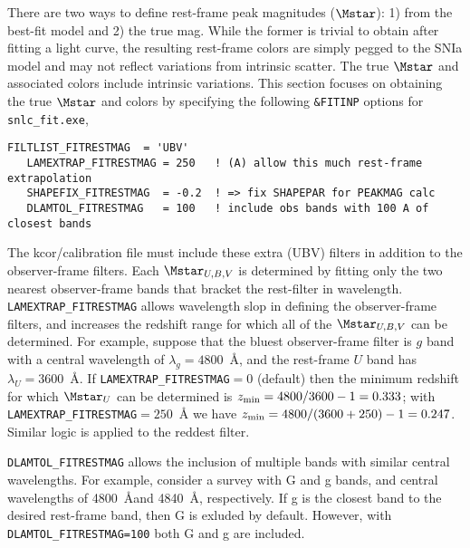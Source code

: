 \documentclass[12pt]{article}
\newcommand{\lamg}{\lambda_g}
\newcommand{\lamU}{\lambda_U}
\begin{document}
There are two ways to define rest-frame peak magnitudes 
($\Mstar$):
1) from the best-fit model  and 2) the true mag.
While the former is trivial to obtain after fitting
a light curve, the resulting rest-frame colors
are simply pegged to the SNIa model and may not reflect
variations from intrinsic scatter. The true $\Mstar$ and
associated colors include intrinsic variations.
This section focuses on obtaining the true $\Mstar$
and colors by specifying the following {\tt \&FITINP} options
for {\tt snlc\_fit.exe},
%
\begin{Verbatim}[frame=single]
   FILTLIST_FITRESTMAG  = 'UBV'
   LAMEXTRAP_FITRESTMAG = 250   ! (A) allow this much rest-frame extrapolation
   SHAPEFIX_FITRESTMAG  = -0.2  ! => fix SHAPEPAR for PEAKMAG calc
   DLAMTOL_FITRESTMAG   = 100   ! include obs bands with 100 A of closest bands
\end{Verbatim}
%
The kcor/calibration file must include these extra (UBV) 
filters in addition to the observer-frame filters.
Each $\Mstar_{U,B,V}$ is determined by fitting only
the two nearest observer-frame bands that bracket the
rest-filter in wavelength. {\tt LAMEXTRAP\_FITRESTMAG}
allows wavelength slop in defining the observer-frame filters, 
and increases the redshift range for which all of 
the $\Mstar_{U,B,V}$ can be determined.
For example, suppose that the bluest observer-frame filter
is $g$ band with a central wavelength of $\lamg = 4800$~\AA, 
and the rest-frame $U$ band has $\lamU = 3600$~\AA. 
If {\tt LAMEXTRAP\_FITRESTMAG}$=0$ (default) then the minimum
redshift for which $\Mstar_U$ can be determined is
$z_{\rm min} = 4800/3600-1= 0.333$;
with {\tt LAMEXTRAP\_FITRESTMAG}$=250$~{\AA} we have 
$z_{\rm min} = 4800/(3600+250)-1= 0.247$.
Similar logic is applied to the reddest filter.

{\tt DLAMTOL\_FITRESTMAG} allows the inclusion of multiple bands
with similar central wavelengths. For example, consider a survey
with G and g bands, and central wavelengths of 4800~\AA and 4840~\AA,
respectively. If g is the closest band to the desired rest-frame band,
then G is exluded by default. However, with {\tt DLAMTOL\_FITRESTMAG=100}
both G and g are included.
\end{document}

